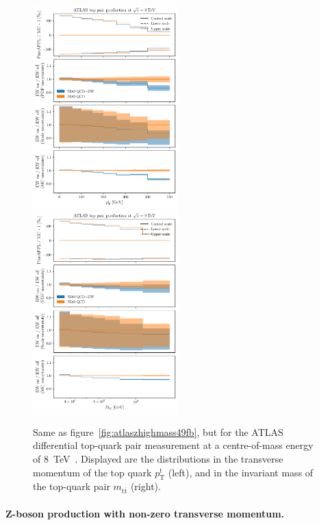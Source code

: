 \begin{figure}[!t]
    \centering
    \includegraphics[width=0.5\textwidth]{figures/pineappl_ATLAS_TTB_DIFF_8TEV_LJ_TPT}%
    \includegraphics[width=0.5\textwidth]{figures/pineappl_ATLAS_TTB_DIFF_8TEV_LJ_TTM}
    \caption{Same as figure~\ref{fig:atlaszhighmass49fb}, but for the ATLAS
      differential top-quark pair measurement at a centre-of-mass energy of
      \SI{8}{\tera\electronvolt}~\cite{Aad:2015mbv}. Displayed are the distributions in the
      transverse momentum of the top quark $p_\mathrm{T}^\mathrm{t}$ (left), and in the invariant
      mass of the top-quark pair $m_{\mathrm{t}\bar{\mathrm{t}}}$ (right).}
    \label{fig:atlastop}
\end{figure}



\paragraph{Z-boson production with non-zero transverse momentum.}


